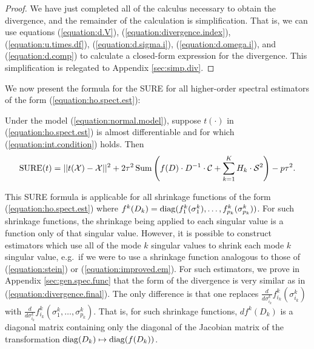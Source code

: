 \begin{proof}
We have just completed all of the calculus necessary to obtain the divergence, and the remainder of the calculation is simplification. That is, we can use equations (\ref{equation:d.V}), (\ref{equation:divergence.index}), (\ref{equation:u.times.df}), (\ref{equation:d.sigma.i}), (\ref{equation:d.omega.i}), and (\ref{equation:d.comp}) to calculate a closed-form expression for the divergence. This simplification is relegated to Appendix \ref{sec:simp.div}.
\end{proof}



We now present the formula for the  SURE for all higher-order spectral estimators of the form (\ref{equation:ho.spect.est}):
\begin{theorem}
Under the model (\ref{equation:normal.model}), suppose $t(\cdot)$ in (\ref{equation:ho.spect.est}) is almost differentiable and for which (\ref{equation:int.condition}) holds. Then
\begin{align}
\operatorname*{SURE}(t) =  ||t(\mathcal{X}) - \mathcal{X}||^2 + 2\tau^2\operatorname*{Sum}\left(f(D) \cdot D^{-1}\cdot \mathcal{C} + \sum_{k=1}^KH_k \cdot \mathcal{S}^2\right) - p\tau^2. \label{equation:complete.sure}
\end{align}
\end{theorem}

This SURE formula is applicable for all shrinkage functions of the form (\ref{equation:ho.spect.est}) where $f^k(D_k) = \operatorname*{diag}(f_1^k(\sigma_1^k),\ldots,f_{p_k}^k(\sigma_{p_k}^k))$. For such shrinkage functions, the shrinkage being applied to each singular value is a function only of that singular value. However, it is possible to construct estimators which use all of the mode $k$ singular values to shrink each mode $k$ singular value, e.g.\ if we were to use a shrinkage function analogous to those of (\ref{equation:stein}) or (\ref{equation:improved.em}). For such estimators, we prove in Appendix \ref{sec:gen.spec.func} that the form of the divergence is very similar as in (\ref{equation:divergence.final}). The only difference is that one replaces $\frac{d}{d\sigma_{i_k}^k}f_{i_k}^k(\sigma_{i_k}^k)$ with $\frac{d}{d\sigma_{i_k}^k}f_{i_k}^k(\sigma_{1}^k,\ldots,\sigma_{p_k}^k)$. That is, for such shrinkage functions, $df^k(D_k)$ is a diagonal matrix containing only the diagonal of the Jacobian matrix of the transformation $\operatorname*{diag}(D_k) \mapsto \operatorname*{diag}(f(D_k))$.



